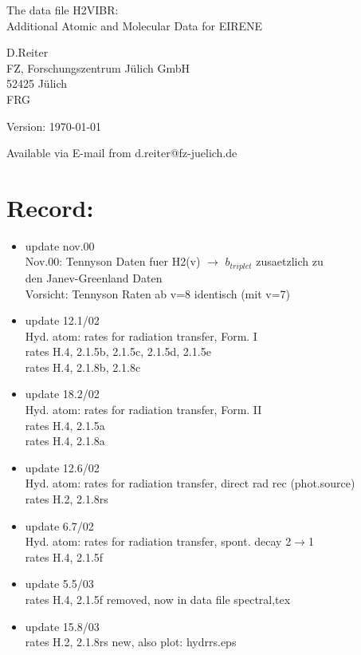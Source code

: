 \documentclass[12pt]{article}
\begin{document}
\parindent 0pt
{\LARGE \bf \center
\vspace*{3truecm}

The data file H2VIBR: \\
Additional Atomic and Molecular Data for EIRENE
\vspace*{3truecm}

D.Reiter \\
FZ, Forschungszentrum J\"ulich GmbH \\
52425 J\"ulich \\
FRG
\vspace{5truecm}

Version: \today
\vspace{3truecm}

Available via E-mail from d.reiter@fz-juelich.de
}
\tableofcontents
\newpage

\section{Record:}
\begin{itemize}
\item update  nov.00  \\
Nov.00: Tennyson Daten fuer H2(v) $\rightarrow$ $b_{triplet}$ zusaetzlich zu\\
        den Janev-Greenland Daten       \\
        Vorsicht: Tennyson Raten ab v=8 identisch (mit v=7)
\item update  12.1/02 \\
   Hyd. atom: rates for radiation transfer, Form. I\\
     rates H.4, 2.1.5b, 2.1.5c, 2.1.5d, 2.1.5e \\
     rates H.4, 2.1.8b, 2.1.8c \\
\item update  18.2/02 \\
   Hyd. atom: rates for radiation transfer, Form. II \\
     rates H.4, 2.1.5a \\
     rates H.4, 2.1.8a \\
\item update  12.6/02 \\
   Hyd. atom: rates for radiation transfer, direct rad rec (phot.source) \\
     rates H.2, 2.1.8rs\\
\item update   6.7/02 \\
   Hyd. atom: rates for radiation transfer, spont. decay 2$\rightarrow$1 \\
     rates H.4, 2.1.5f\\
\item update   5.5/03 \\
     rates H.4, 2.1.5f removed, now in data file spectral,tex\\
\item update  15.8/03 \\
     rates H.2, 2.1.8rs new, also plot: hydrrs.eps\\
\end{itemize}
\end{document}
